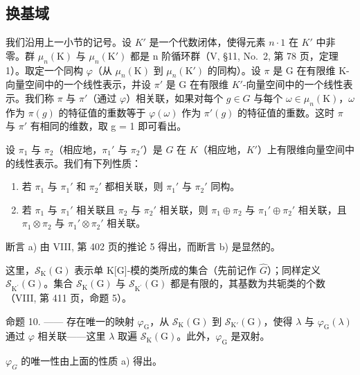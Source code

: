 \subsection{换基域}

我们沿用上一小节的记号。设 \(K'\) 是一个代数闭体，使得元素 \(n \cdot 1\) 在 \(K'\) 中非零。群 \(\mu_{n}(\mathrm{K})\) 与 \(\mu_{n}(\mathrm{K}')\) 都是 n 阶循环群（V, §11, No.~2, 第 78 页，定理 1）。取定一个同构 \(\varphi\)（从 \(\mu_{n}(\mathrm{K})\) 到 \(\mu_{n}(\mathrm{K}')\) 的同构）。设 \(\pi\) 是 G 在有限维 K-向量空间中的一个线性表示，并设 \(\pi'\) 是 G 在有限维 \(K'\)-向量空间中的一个线性表示。我们称 \(\pi\) 与 \(\pi'\)（通过 \(\varphi\)）相关联，如果对每个 \(g \in G\) 与每个 \(\omega \in \mu_{n}(\mathrm{K})\)，\(\omega\) 作为 \(\pi(g)\) 的特征值的重数等于 \(\varphi(\omega)\) 作为 \(\pi'(g)\) 的特征值的重数。这时 \(\pi\) 与 \(\pi'\) 有相同的维数，取 g = 1 即可看出。

设 \(\pi_1\) 与 \(\pi_2\)（相应地，\(\pi_1'\) 与 \(\pi_2'\)）是 \(G\) 在 \(K\)（相应地，\(K'\)）上有限维向量空间中的线性表示。我们有下列性质：

\begin{enumerate}
\def\labelenumi{\alph{enumi})}
\item
  若 \(\pi_1\) 与 \(\pi_1'\) 和 \(\pi_2'\) 都相关联，则 \(\pi_1'\) 与 \(\pi_2'\) 同构。
\item
  若 \(\pi_1\) 与 \(\pi_1'\) 相关联且 \(\pi_2\) 与 \(\pi_2'\) 相关联，则 \(\pi_1 \oplus \pi_2\) 与 \(\pi_1' \oplus \pi_2'\) 相关联，且 \(\pi_1 \otimes \pi_2\) 与 \(\pi_1' \otimes \pi_2'\) 相关联。
\end{enumerate}

断言 a) 由 VIII, 第 402 页的推论 5 得出，而断言 b) 是显然的。

这里，\(\mathcal{S}_{\mathrm{K}}(\mathrm{G})\) 表示单 K{[}G{]}-模的类所成的集合（先前记作 \(\widehat{G}\)）；同样定义 \(\mathcal{S}_{\mathrm{K}^{\prime}}(\mathrm{G})\)。集合 \(\mathcal{S}_{\mathrm{K}}(\mathrm{G})\) 与 \(\mathcal{S}_{\mathrm{K}^{\prime}}(\mathrm{G})\) 都是有限的，其基数为共轭类的个数（VIII, 第 411 页，命题 5）。

命题 10. —— 存在唯一的映射 \(\varphi_{\mathrm{G}}\)，从 \(\mathcal{S}_{\mathrm{K}}(\mathrm{G})\) 到 \(\mathcal{S}_{\mathrm{K}'}(\mathrm{G})\)，使得 \(\lambda\) 与 \(\varphi_{\mathrm{G}}(\lambda)\) 通过 \(\varphi\) 相关联——这里 \(\lambda\) 取遍 \(\mathcal{S}_{\mathrm{K}}(\mathrm{G})\)。此外，\(\varphi_{\mathrm{G}}\) 是双射。

\(\varphi_{G}\) 的唯一性由上面的性质 a) 得出。

